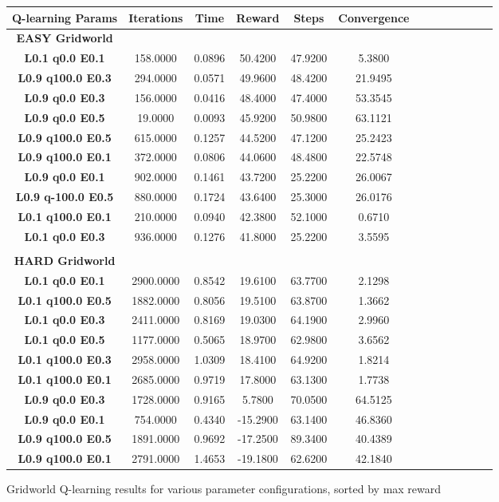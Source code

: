 \documentclass[h]{article}
\begin{document}
\begin{figure}[H] 
\centering
\begin{tabular}{ | c | c  | c | c | c | c | c | c| c| c| c| c| c | } 
\hline
\textbf{ Q-learning Params } & \textbf{Iterations} & \textbf{Time} & \textbf{Reward} & \textbf{Steps} & \textbf{Convergence}   \\
\hline
\textbf{EASY Gridworld} \\ \hline
\textbf{L0.1 q0.0 E0.1} & 158.0000 & 0.0896 & 50.4200 & 47.9200 & 5.3800 \\ \hline
\textbf{L0.9 q100.0 E0.3} & 294.0000 & 0.0571 & 49.9600 & 48.4200 & 21.9495 \\ \hline
\textbf{L0.9 q0.0 E0.3} & 156.0000 & 0.0416 & 48.4000 & 47.4000 & 53.3545 \\ \hline
\textbf{L0.9 q0.0 E0.5} & 19.0000 & 0.0093 & 45.9200 & 50.9800 & 63.1121 \\ \hline
\textbf{L0.9 q100.0 E0.5} & 615.0000 & 0.1257 & 44.5200 & 47.1200 & 25.2423 \\ \hline
\textbf{L0.9 q100.0 E0.1} & 372.0000 & 0.0806 & 44.0600 & 48.4800 & 22.5748 \\ \hline
\textbf{L0.9 q0.0 E0.1} & 902.0000 & 0.1461 & 43.7200 & 25.2200 & 26.0067 \\ \hline
\textbf{L0.9 q-100.0 E0.5} & 880.0000 & 0.1724 & 43.6400 & 25.3000 & 26.0176 \\ \hline
\textbf{L0.1 q100.0 E0.1} & 210.0000 & 0.0940 & 42.3800 & 52.1000 & 0.6710 \\ \hline
\textbf{L0.1 q0.0 E0.3} & 936.0000 & 0.1276 & 41.8000 & 25.2200 & 3.5595 \\ 
\hline
\\
\textbf{HARD Gridworld} \\ \hline
\textbf{L0.1 q0.0 E0.1} & 2900.0000 & 0.8542 & 19.6100 & 63.7700 & 2.1298 \\ \hline
\textbf{L0.1 q100.0 E0.5} & 1882.0000 & 0.8056 & 19.5100 & 63.8700 & 1.3662 \\ \hline
\textbf{L0.1 q0.0 E0.3} & 2411.0000 & 0.8169 & 19.0300 & 64.1900 & 2.9960 \\ \hline
\textbf{L0.1 q0.0 E0.5} & 1177.0000 & 0.5065 & 18.9700 & 62.9800 & 3.6562 \\ \hline
\textbf{L0.1 q100.0 E0.3} & 2958.0000 & 1.0309 & 18.4100 & 64.9200 & 1.8214 \\ \hline
\textbf{L0.1 q100.0 E0.1} & 2685.0000 & 0.9719 & 17.8000 & 63.1300 & 1.7738 \\ \hline
\textbf{L0.9 q0.0 E0.3} & 1728.0000 & 0.9165 & 5.7800 & 70.0500 & 64.5125 \\ \hline
\textbf{L0.9 q0.0 E0.1} & 754.0000 & 0.4340 & -15.2900 & 63.1400 & 46.8360 \\ \hline
\textbf{L0.9 q100.0 E0.5} & 1891.0000 & 0.9692 & -17.2500 & 89.3400 & 40.4389 \\ \hline
\textbf{L0.9 q100.0 E0.1} & 2791.0000 & 1.4653 & -19.1800 & 62.6200 & 42.1840 \\ 
\hline
\hline
\end{tabular}
\caption*{Gridworld Q-learning results for various parameter configurations, sorted by max reward } 
\end{figure}
\end{document}
